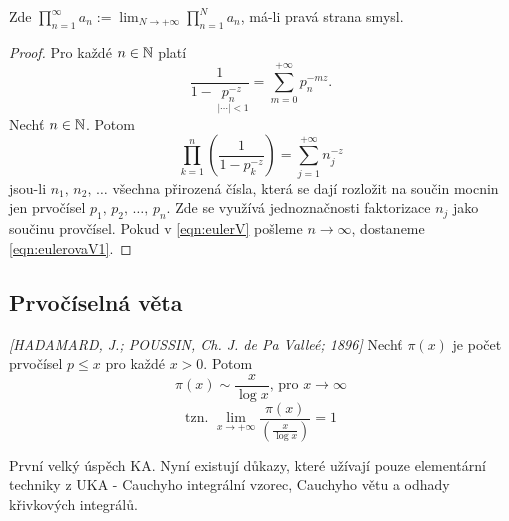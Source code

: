 \begin{note*}
Zde $\prod_{n=1}^\infty a_n:=\lim_{N\rightarrow+\infty}\prod_{n=1}^N a_n$, má-li pravá strana smysl.
\end{note*}

\begin{proof}
Pro každé $n\in\operatorname{\mathbb{N}}$ platí 
$$\frac{1}{1-\underset{\phantom{.}|\cdots|<1}{p_n^{-z}}}=\sum_{m=0}^{+\infty}p_n^{-mz}.$$
Nechť $n\in\operatorname{\mathbb{N}}$. Potom
\begin{equation}\tag{*}\label{eqn:eulerV}
    \prod_{k=1}^n\left(\frac{1}{1-p_k^{-z}}\right)=\sum_{j=1}^{+\infty}n_j^{-z}
\end{equation}
jsou-li $n_1,\,n_2,\,\ldots$ všechna přirozená čísla, která se dají rozložit na součin mocnin jen prvočísel $p_1,\,p_2,\,\ldots,\,p_n$. 
Zde se využívá jednoznačnosti faktorizace $n_j$ jako součinu provčísel. Pokud v \cref{eqn:eulerV} pošleme $n\rightarrow\infty$, dostaneme \cref{eqn:eulerovaV1}.
\end{proof}

\subsection{Prvočíselná věta}

\begin{theorem}[Prvočíselná] \emph{[HADAMARD, J.; POUSSIN, Ch. J. de Pa Valleé; 1896]}
Nechť $\pi(x)$ je počet prvočísel $p\leq x$ pro každé $x>0$. Potom 
$$\pi(x)\sim \frac{x}{\log x}\text{, pro }x\rightarrow\infty $$
$$\text{tzn. }\lim_{x\rightarrow+\infty}\frac{\pi(x)}{\left(\frac{x}{\log x}\right)}=1
$$
\end{theorem}

\begin{note*}
První velký úspěch KA. Nyní existují důkazy, které užívají pouze elementární techniky z UKA - Cauchyho integrální vzorec, Cauchyho větu a odhady křivkových integrálů.
\end{note*}